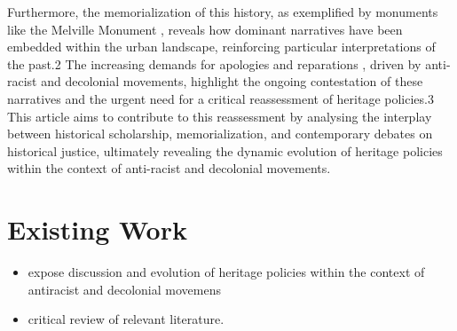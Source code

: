 \documentclass{scrartcl}
\begin{document}
Furthermore, the memorialization of this history, as exemplified by monuments like the Melville Monument \cite{godard_2018}, reveals how dominant narratives have been embedded within the urban landscape, reinforcing particular interpretations of the past.2 The increasing demands for apologies and reparations \cite{hartel_2024}, driven by anti-racist and decolonial movements, highlight the ongoing contestation of these narratives and the urgent need for a critical reassessment of heritage policies.3 This article aims to contribute to this reassessment by analysing the interplay between historical scholarship, memorialization, and contemporary debates on historical justice, ultimately revealing the dynamic evolution of heritage policies within the context of anti-racist and decolonial movements.

\section{Existing Work}

\begin{itemize}
    \item expose discussion and evolution of heritage policies within the context of antiracist and decolonial movemens
    \item critical review of relevant literature.
\end{itemize}
\end{document}
